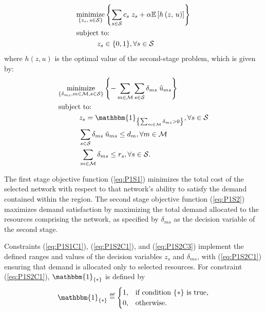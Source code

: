 \documentclass[12pt,dvipsnames]{report}
\newcommand\defeq{\mathrel{\overset{\makebox[0pt]{\mbox{\normalfont\tiny\sffamily def}}}{=}}}
\begin{document}
\vspace{3mm}
\begin{tcolorbox}[title = Problem 1 (Two-Stage Stochastic Optimization Problem)]
\begin{align}
& \underset{\left\{z_s,\, s \in \mathcal{S}\right\}}{\text{minimize}} \left\{ \sum_{s \in \mathcal{S}} c_s \; z_s + \alpha \mathbb{E}\left[ h\left( z,\, u \right) \right] \right\} \label{eq:P1S1}\\
& \text{subject to:}  \nonumber \\
& \hspace{0.4in} z_s \in \{0, 1\}, \forall s \in \mathcal{S} \label{eq:P1S1C1}
\end{align}
where $h(z, u)$ is the optimal value of the second-stage problem, which is given by:
\begin{align}
& \underset{\left\{\substack{\delta_{ms}, m \in \mathcal{M}, s \in \mathcal{S}}\right\}}{\mathrm{minimize}} \left\{ - \sum_{m \in \mathcal{M}} \sum_{s \in \mathcal{S}} \delta_{ms} \; \tilde{u}_{ms} \right\} \label{eq:P1S2}\\
& \text{subject to:}  \nonumber \\
& \hspace{0.4in} z_s = \mathbbm{1}_{\left\{\sum_{m \in \mathcal{M}} \delta_{ms} > 0\right\}}, \forall s \in \mathcal{S} \label{eq:P1S2C1}\\
& \hspace{0.4in} \sum_{s \in \mathcal{S}} \delta_{ms} \; \tilde{u}_{ms} \leq d_m, \forall m \in \mathcal{M} \label{eq:P1S2C2}\\
& \hspace{0.4in} \sum_{m \in \mathcal{M}} \delta_{ms} \leq r_s, \forall s \in \mathcal{S}. \label{eq:P1S2C3}
\end{align}
\end{tcolorbox}

The first stage objective function (\ref{eq:P1S1}) minimizes the total cost of the selected network with respect to that network's ability to satisfy the demand contained within the region.  The second stage objective function (\ref{eq:P1S2}) maximizes demand satisfaction by maximizing the total demand allocated to the resources comprising the network, as specified by $\delta_{ms}$ as the decision variable of the second stage.

Constraints (\ref{eq:P1S1C1}), (\ref{eq:P1S2C1}), and (\ref{eq:P1S2C3}) implement the defined ranges and values of the decision variables $z_s$ and $\delta_{ms}$, with (\ref{eq:P1S2C1}) ensuring that demand is allocated only to selected resources.  For constraint (\ref{eq:P1S2C1}), $\mathbbm{1}_{\{*\}}$ is defined by
\[ \mathbbm{1}_{\{*\}} \defeq
	\begin{cases}
		1,& \text{if condition $\{*\}$ is true,}\\
		0,& \text{otherwise}.
	\end{cases}
\]
\end{document}
